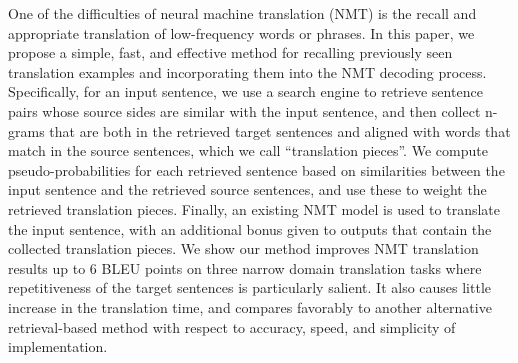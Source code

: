 One of the difficulties of neural machine translation (NMT) is the recall and appropriate translation of low-frequency words or phrases. In this paper, we propose a simple, fast, and effective method for recalling previously seen translation examples and incorporating them into the NMT decoding process. Specifically, for an input sentence, we use a search engine to retrieve sentence pairs whose source sides are similar with the input sentence, and then collect n-grams that are both in the retrieved target sentences and aligned with words that match in the source sentences, which we call ``translation pieces''. We compute pseudo-probabilities for each retrieved sentence based on similarities between the input sentence and the retrieved source sentences, and use these to weight the retrieved translation pieces. Finally, an existing NMT model is used to translate the input sentence, with an additional bonus given to outputs that contain the collected translation pieces. We show our method improves NMT translation results up to 6 BLEU points on three narrow domain translation tasks where repetitiveness of the target sentences is particularly salient. It also causes little increase in the translation time, and compares favorably to another alternative retrieval-based method with respect to accuracy, speed, and simplicity of implementation.
